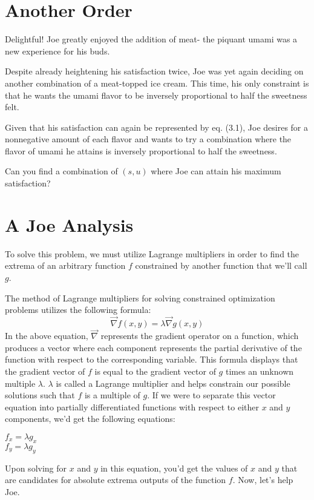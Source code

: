\setcounter{chapter}{5}
\chapter{Another Order}
Delightful! Joe greatly enjoyed the addition of meat- the piquant umami was a new experience for his buds.

Despite already heightening his satisfaction twice, Joe was yet again deciding on another combination of a meat-topped ice cream.
This time, his only constraint is that he wants the umami flavor to be inversely proportional to half the sweetness felt.
\begin{eg}
	Given that his satisfaction can again be represented by eq. (3.1), Joe desires for a nonnegative amount of each flavor and wants to try a combination where the flavor of umami he attains is inversely proportional to half the sweetness.

	Can you find a combination of $(s, u)$ where Joe can attain his maximum satisfaction?
\end{eg}
\setcounter{chapter}{6}
\chapter{A Joe Analysis}
To solve this problem, we must utilize Lagrange multipliers in order to find the extrema of an arbitrary function $f$ constrained by another function that we'll call $g$.

The method of Lagrange multipliers for solving constrained optimization problems utilizes the following formula:
\large
\begin{equation}
	\vec{\nabla}f(x, y) = \lambda \vec{\nabla}g(x, y)
\end{equation}
\normalsize
In the above equation, $\vec{\nabla}$ represents the gradient operator on a function, which produces a vector where each component represents the partial derivative of the function with respect to the corresponding variable.
This formula displays that the gradient vector of $f$ is equal to the gradient vector of $g$ times an unknown multiple $\lambda$.
$\lambda$ is called a Lagrange multiplier and helps constrain our possible solutions such that $f$ is a multiple of $g$.
If we were to separate this vector equation into partially differentiated functions with respect to either $x$ and $y$ components, we'd get the following equations:
\begin{center}
	$f_x=\lambda g_x$\\
	$f_y=\lambda g_y$
\end{center}
Upon solving for $x$ and $y$ in this equation, you'd get the values of $x$ and $y$ that are candidates for absolute extrema outputs of the function $f$.
Now, let's help Joe.

